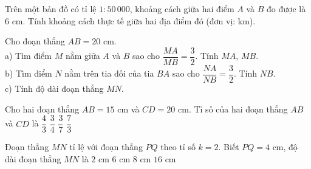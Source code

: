 \begin{bt}%
	Trên một bản đồ có tỉ lệ $1:50\,000$, khoảng cách giữa hai điểm $A$ và $B$ đo được là $6\text{ cm}$. Tính khoảng cách thực tế giữa hai địa điểm đó (đơn vị: km).
\end{bt}

\begin{bt}%
	Cho đoạn thẳng $AB=20\text{ cm}$.\\
	a) Tìm điểm $M$ nằm giữa $A$ và $B$ sao cho $\dfrac{MA}{MB}=\dfrac32$. Tính $MA$, $MB$.\\
	b) Tìm điểm $N$ nằm trên tia đối của tia $BA$ sao cho $\dfrac{NA}{NB}=\dfrac32$. Tính $NB$.\\
	c) Tính độ dài đoạn thẳng $MN$.
\end{bt}

\begin{ex}%
	Cho hai đoạn thẳng $AB = 15\text{ cm}$ và $CD = 20\text{ cm}$. Tỉ số của hai đoạn thẳng $AB$ và $CD$ là
	\choice
	{$\dfrac{4}{3}$}
	{\True $\dfrac{3}{4}$}
	{$\dfrac{3}{7}$}
	{$\dfrac{7}{3}$}
\end{ex}

\begin{ex}%
	Đoạn thẳng $MN$ tỉ lệ với đoạn thẳng $PQ$ theo tỉ số $k=2$. Biết $PQ = 4\text{ cm}$, độ dài đoạn thẳng $MN$ là
	\choice
	{$2\text{ cm}$}
	{$6\text{ cm}$}
	{\True $8\text{ cm}$}
	{$16\text{ cm}$}
\end{ex}


